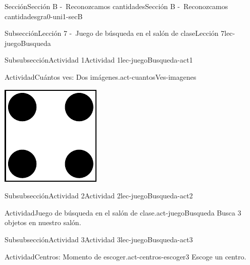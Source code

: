 \documentclass[twoside,10pt,]{article}
\begin{document}
\begin{sectionptx}{Sección}{Sección B -~Reconozcamos cantidades}{}{Sección B -~Reconozcamos cantidades}{}{}{gra0-uni1-secB}
\begin{subsectionptx}{Subsección}{Lección 7 -~Juego de búsqueda en el salón de clase}{}{Lección 7}{}{}{lec-juegoBusqueda}
\begin{subsubsectionptx}{Subsubsección}{Actividad 1}{}{Actividad 1}{}{}{lec-juegoBusqueda-act1}
\begin{activity}{Actividad}{Cuántos ves: Dos imágenes.}{act-cuantosVes-imagenes}
\begin{sidebyside}{2}{0}{0}{0}
\begin{sbspanel}{0.5}
\includegraphics[width=\linewidth]{external/svg-source/tikz-file-148153.pdf}
\end{sbspanel}%
\end{sidebyside}%
\end{activity}%
\end{subsubsectionptx}
%
%
\typeout{************************************************}
\typeout{************************************************}
%
\begin{subsubsectionptx}{Subsubsección}{Actividad 2}{}{Actividad 2}{}{}{lec-juegoBusqueda-act2}
\begin{activity}{Actividad}{Juego de búsqueda en el salón de clase.}{act-juegoBusqueda}%
Busca 3 objetos en nuestro salón.%
\end{activity}%
\end{subsubsectionptx}
%
%
\typeout{************************************************}
\typeout{************************************************}
%
\begin{subsubsectionptx}{Subsubsección}{Actividad 3}{}{Actividad 3}{}{}{lec-juegoBusqueda-act3}
\begin{activity}{Actividad}{Centros: Momento de escoger.}{act-centros-escoger3}%
Escoge un centro.%
\begin{sidebyside}{2}{0.025}{0.025}{0.05}%

\end{sidebyside}
\end{activity}
\end{subsubsectionptx}
\end{subsectionptx}
\end{sectionptx}
\end{document}

